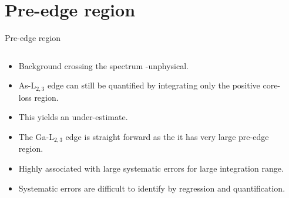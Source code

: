\documentclass[aspectratio=169]{beamer}
\begin{document}
\section{Pre-edge region}


\begin{frame}{Pre-edge region}

\begin{columns}[t]
	\begin{column}{.6\textwidth}
		\begin{itemize}
			\item Background crossing the spectrum -unphysical.
			\item As-L$_{2,3}$ edge can still be quantified by integrating only the positive core-loss region.
			\item This yields an under-estimate.
			\item The Ga-L$_{2,3}$ edge is straight forward as the it has very large pre-edge region.
			\item Highly associated with large systematic errors for large integration range.
			\item Systematic errors are difficult to identify by regression and quantification.
		\end{itemize}
	\end{column}

	\begin{column}{.4\textwidth}
	\end{column}
\end{columns}

\end{frame}

\end{document}
